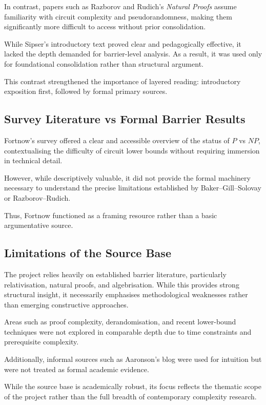 \documentclass[12pt]{article}
\begin{document}
In contrast, papers such as Razborov and Rudich's \textit{Natural Proofs} assume familiarity with circuit complexity and pseudorandomness, making them significantly more difficult to access without prior consolidation.

While Sipser's introductory text proved clear and pedagogically effective, it lacked the depth demanded for barrier-level analysis. As a result, it was used only for foundational consolidation rather than structural argument.

This contrast strengthened the importance of layered reading: introductory exposition first, followed by formal primary sources.

\subsection{Survey Literature vs Formal Barrier Results}

Fortnow's survey offered a clear and accessible overview of the status of $P$ vs $NP$, contextualising the difficulty of circuit lower bounds without requiring immersion in technical detail.

However, while descriptively valuable, it did not provide the formal machinery necessary to understand the precise limitations established by Baker–Gill–Solovay or Razborov–Rudich.

Thus, Fortnow functioned as a framing resource rather than a basic argumentative source.

\subsection{Limitations of the Source Base}

The project relies heavily on established barrier literature, particularly relativisation, natural proofs, and algebrisation. While this provides strong structural insight, it necessarily emphasises methodological weaknesses rather than emerging constructive approaches.

Areas such as proof complexity, derandomisation, and recent lower-bound techniques were not explored in comparable depth due to time constraints and prerequisite complexity.

Additionally, informal sources such as Aaronson's blog were used for intuition but were not treated as formal academic evidence.

While the source base is academically robust, its focus reflects the thematic scope of the project rather than the full breadth of contemporary complexity research.
\end{document}
